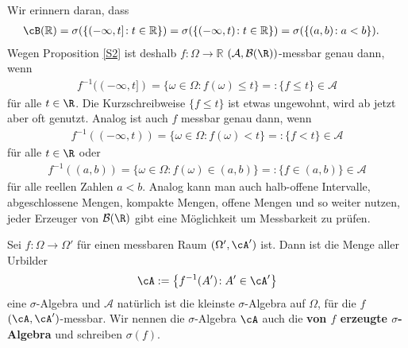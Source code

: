 \begin{bem}\label{yui}
	Wir erinnern daran, dass
	\begin{align*}
		\cB(\mathbb{R}) &= \sigma(\{ (-\infty,t] \! : t \in \mathbb{R} \})= \sigma(\{ (-\infty,t) \! : t \in \mathbb{R} \})= \sigma(\{ (a,b) \! : a < b \}).
	\end{align*}
	Wegen Proposition \ref{S2} ist deshalb $f \! : \Omega \rightarrow \mathbb{R}$ $(\mathcal A, \mathcal B(\R))$-messbar genau dann, wenn 
	\begin{gather*}
		f^{-1} ((-\infty,t]) = \{ \omega \in \Omega \! : f(\omega) \leq t \} =: \{ f \leq t \} \in \mathcal A
	\end{gather*}
	f\"ur alle $t\in\R$. Die Kurzschreibweise $\{f\leq t\}$ ist etwas ungewohnt, wird ab jetzt aber oft genutzt. Analog ist auch $f$ messbar genau dann, wenn
	\begin{align*}
		f^{-1} ((-\infty,t)) = \{ \omega\in \Omega \! : f(\omega) < t \} =: \{ f < t \} \in \mathcal A
	\end{align*}
	f\"ur alle $t\in\R$ oder 
	\begin{align*}
		f^{-1} ((a,b)) = \{ \omega\in\Omega \! : f(\omega) \in (a,b) \} =: \{ f \in (a,b) \}\in \mathcal A
	\end{align*}
	f\"ur alle reellen Zahlen $a<b$.
	Analog kann man auch halb-offene Intervalle, abgeschlossene Mengen, kompakte Mengen, offene Mengen und so weiter nutzen, jeder Erzeuger von $\mathcal B(\R)$ gibt eine M\"oglichkeit um Messbarkeit zu pr\"ufen.
\end{bem}

\begin{deff}\label{Kat}
	Sei $f \! : \Omega \rightarrow \Omega'$ für einen messbaren Raum $(\Omega', \cA')$ ist. Dann ist die Menge aller Urbilder \[ \cA := \big\{ f^{-1}(A') \! : A' \in \cA' \big\} \] eine $\sigma$-Algebra und $\mathcal A$ nat\"urlich ist die kleinste $\sigma$-Algebra auf $\Omega$, f\"ur die $f$ $(\cA, \cA')$-messbar. Wir nennen die $\sigma$-Algebra $\cA$ auch die \textbf{von $f$ erzeugte $\sigma$-Algebra} und schreiben $\sigma(f)$.
\end{deff}

